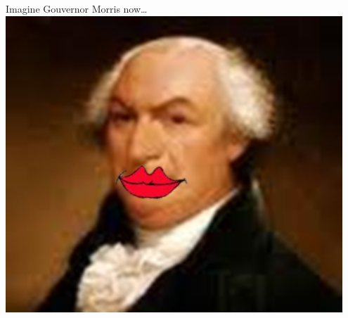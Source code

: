 \begin{frame}
    \begin{columns}[onlytextwidth]
            { \large Imagine Gouvernor Morris now\ldots }
            \centering
            \includegraphics[width=0.95\textwidth]{img/morris-smile.png} \\
    \end{columns}
\end{frame}

